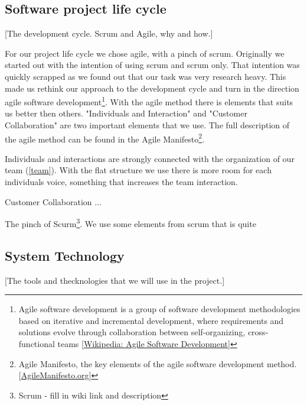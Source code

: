 \documentclass[12pt]{article}
\begin{document}
    \subsection{Software project life cycle} [The development cycle. Scrum and Agile, why and how.]
    
    For our project life cycle we chose agile, with a pinch of scrum. Originally we started out with the intention of using scrum and scrum only. That intention was quickly scrapped as we found out that our task was very research heavy. This made us rethink our approach to the development cycle and turn in the direction agile software development\footnote
        {Agile software development is a group of software development methodologies based on iterative and incremental development, where requirements and solutions evolve through collaboration between self-organizing, cross-functional teams [\href{http://en.wikipedia.org/wiki/Agile_software_development.}{Wikipedia: Agile Software Development}]}. 
    With the agile method there is elements that suits us better then others. "Individuals and Interaction" and "Customer Collaboration" are two important elements that we use. The full description of the agile method can be found in the Agile Manifesto\footnote
        {Agile Manifesto, the key elements of the agile software development method. [\href{http://http://agilemanifesto.org/}{AgileManifesto.org}]}.
    
    Individuals and interactions are strongly connected with the organization of our team (\ref{team}). With the flat structure we use there is more room for each individuals voice, something that increases the team interaction. 
    
    Customer Collaboration ...
    
    The pinch of Scurm\footnote
        {Scrum - fill in wiki link and description}. 
    We use some elements from scrum that is quite 



    \subsection{System Technology}\label{tools} [The tools and thecknologies that we will use in the project.]
    
\end{document}
